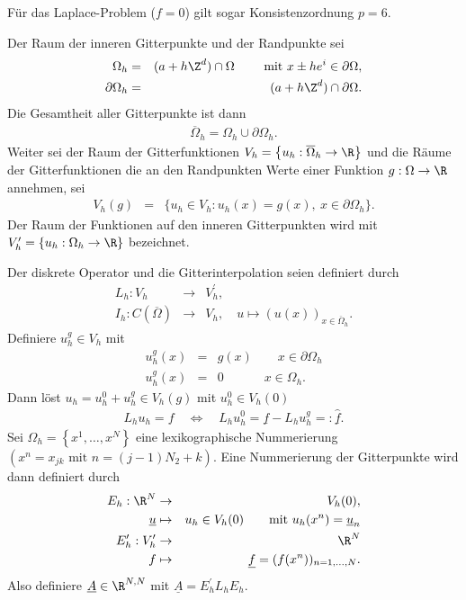 \begin{Bemerkung}
    Für das Laplace-Problem ($f = 0$) gilt sogar Konsistenzordnung $p = 6$.
\end{Bemerkung}


\begin{Implementation}
    Der Raum der inneren Gitterpunkte und der Randpunkte sei
    \begin{eqnarray*}
          \Omega_h
        &=& (a + h \Z^d) \cap \Omega \qquad \text{ mit } x \pm h e^i
            \in \partial\Omega, \\
          \partial\Omega_h
        &=& (a + h \Z^d) \cap \partial\Omega.
    \end{eqnarray*}
    Die Gesamtheit aller Gitterpunkte ist dann
    \begin{eqnarray*}
        \overline\Omega_h = \Omega_h \cup \partial\Omega_h.
    \end{eqnarray*}
    Weiter sei der Raum der Gitterfunktionen 
    $V_h = \left\{u_h: \overline\Omega_h \to \R\right\}$ und die Räume der Gitterfunktionen die an den Randpunkten Werte einer Funktion $g: \Omega \to \R$ annehmen, sei
    \begin{eqnarray*}
          V_h(g)
        &=& \{u_h \in V_h: u_h(x) = g(x), \ x \in \partial \Omega_h\}.
    \end{eqnarray*}
    Der Raum der Funktionen auf den inneren Gitterpunkten wird mit $V_h^\prime = \{u_h: \Omega_h \to \R\}$ bezeichnet.

    Der diskrete Operator und die Gitterinterpolation seien definiert durch
    \begin{eqnarray*}
        L_h: V_h &\to& V_h^\prime, \\
        I_h: C(\overline\Omega) &\to& V_h, \quad u \mapsto (u(x))_{x\in \overline\Omega_h}.
    \end{eqnarray*}
    Definiere $u_h^g \in V_h$ mit
    \begin{eqnarray*}
        u_h^g(x) &=& g(x) \qquad x\in \partial\Omega_h \\
        u_h^g(x) &=& 0 \quad \ \qquad x\in \Omega_h.
    \end{eqnarray*}
    Dann löst $u_h = u_h^0 + u_h^g \in V_h(g)$ mit $u_h^0 \in V_h(0)$
    \begin{eqnarray*}
        L_h u_h = f \quad \Leftrightarrow \quad
        L_h u_h^0 = \underline f - L_h u_h^g =: \underline{\hat{f}}.
    \end{eqnarray*}
    Sei $\Omega_h = \left\{x^1,\dots,x^N\right\}$ eine lexikographische
    Nummerierung
    $(x^n = x_{jk} \text{ mit } n = (j - 1) N_2 + k)$.
    Eine Nummerierung der Gitterpunkte wird dann definiert durch
    \begin{eqnarray*}
        E_h: \R^N &\to& V_h(0), \\
        \underline u &\mapsto& u_h \in V_h(0)
        \qquad \text{mit } u_h(x^n) = \underline u_n \\
        E_h^\prime: V_h^\prime &\to& \R^N \\
        f &\mapsto& \underline f = (f(x^n))_{n=1,\dots,N}.
    \end{eqnarray*}
    Also definiere $\underline A\in \R^{N,N}$ mit
    $\underline A = E_h^\prime L_h E_h$.
\end{Implementation}


